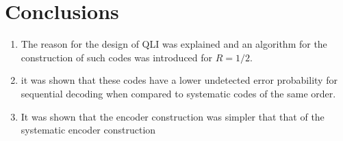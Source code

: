 \documentclass[fontsize=12pt]{article}
\begin{document}
\section{Conclusions}

\begin{enumerate}
\item The reason for the design of QLI was explained and an algorithm for the construction of such codes was introduced for $R=1/2$.

\item it was shown that these codes have a lower undetected error probability for sequential decoding when compared to systematic codes of the same order.

\item It was shown that the encoder construction was simpler that that of the systematic encoder construction


\end{enumerate}
\end{document}
